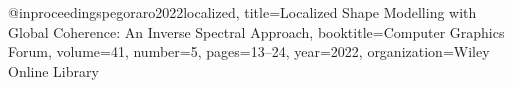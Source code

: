 @inproceedings{pegoraro2022localized,
  title={Localized Shape Modelling with Global Coherence: An Inverse Spectral Approach},
  booktitle={Computer Graphics Forum},
  volume={41},
  number={5},
  pages={13--24},
  year={2022},
  organization={Wiley Online Library}
}